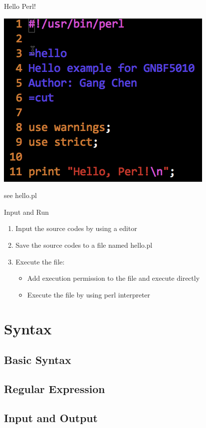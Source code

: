 \documentclass[UTF8]{beamer}
\begin{document}
\begin{frame}[t]{Hello Perl!}
  \centerline{\includegraphics[height=.6\textheight]{hello.png}}
  see hello.pl
\end{frame}

\begin{frame}[t]{Input and Run}
  \begin{enumerate}
    \item Input the source codes by using a editor
    \item Save the source codes to a file named hello.pl
    \item Execute the file:
    \begin{itemize}
      \item Add execution permission to the file and execute directly
      \item Execute the file by using perl interpreter
    \end{itemize}
  \end{enumerate}
\end{frame}

\section{Syntax}
\subsection{Basic Syntax}
\subsection{Regular Expression}
\subsection{Input and Output}
\end{document}
